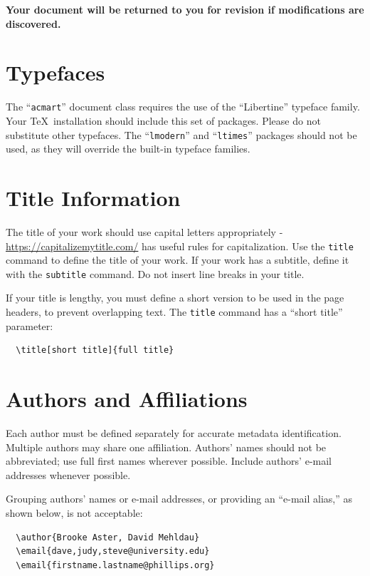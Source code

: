 \documentclass[sigplan,screen]{acmart}
\begin{document}
	{\bfseries Your document will be returned to you for revision if
		modifications are discovered.}

\section{Typefaces}

The ``\verb|acmart|'' document class requires the use of the
``Libertine'' typeface family. Your \TeX\ installation should include
this set of packages. Please do not substitute other typefaces. The
``\verb|lmodern|'' and ``\verb|ltimes|'' packages should not be used,
as they will override the built-in typeface families.

\section{Title Information}

The title of your work should use capital letters appropriately -
\url{https://capitalizemytitle.com/} has useful rules for
capitalization. Use the {\verb|title|} command to define the title of
your work. If your work has a subtitle, define it with the
	{\verb|subtitle|} command.  Do not insert line breaks in your title.

If your title is lengthy, you must define a short version to be used
in the page headers, to prevent overlapping text. The \verb|title|
command has a ``short title'' parameter:
\begin{verbatim}
  \title[short title]{full title}
\end{verbatim}

\section{Authors and Affiliations}

Each author must be defined separately for accurate metadata
identification. Multiple authors may share one affiliation. Authors'
names should not be abbreviated; use full first names wherever
possible. Include authors' e-mail addresses whenever possible.

Grouping authors' names or e-mail addresses, or providing an ``e-mail
alias,'' as shown below, is not acceptable:
\begin{verbatim}
  \author{Brooke Aster, David Mehldau}
  \email{dave,judy,steve@university.edu}
  \email{firstname.lastname@phillips.org}
\end{verbatim}
\end{document}
